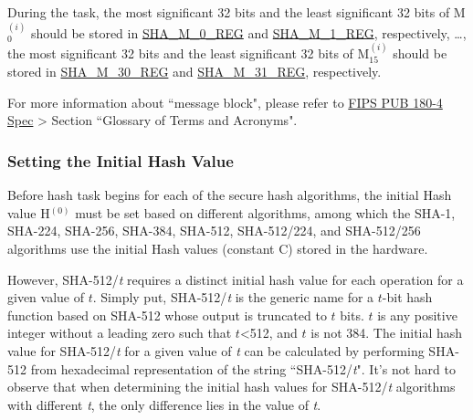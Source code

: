 \documentclass[main\_\_EN.tex]{subfiles}
\begin{document}
\begin{itemize}
    During the task, the most significant 32 bits and the least significant 32 bits of M$^{(i)}_0 $ should be stored in \hyperref[regdesc:SHAMNREG]{SHA\_M\_0\_REG} and \hyperref[regdesc:SHAMNREG]{SHA\_M\_1\_REG}, respectively, \dots, the most significant 32 bits and the least significant 32 bits of M$^{(i)}_{15}$ should be stored in \hyperref[regdesc:SHAMNREG]{SHA\_M\_30\_REG} and \hyperref[regdesc:SHAMNREG]{SHA\_M\_31\_REG}, respectively.

\end{itemize}

\begin{tiplisting}
\vspace{-0.5em}
For more information about ``message block", please refer to \href{https://doi.org/10.6028/NIST.FIPS.180-4}{FIPS PUB 180-4 Spec} > Section ``Glossary of Terms and Acronyms".
\end{tiplisting}

\subsubsection{Setting the Initial Hash Value}\label{sec:sha-initial-hash}

Before hash task begins for each of the secure hash algorithms, the initial Hash value H$^{(0)}$ must be set based on different algorithms, among which the SHA-1, SHA-224, SHA-256, SHA-384, SHA-512, SHA-512/224, and SHA-512/256 algorithms use the initial Hash values (constant C) stored in the hardware.

However, SHA-512/{\it{t}} requires a distinct initial hash value for each operation for a given value of \begin{math}t\end{math}. Simply put, SHA-512/{\it{t}} is the generic name for a \begin{math}t\end{math}-bit hash function based on SHA-512 whose output is truncated to \begin{math}t\end{math} bits. \begin{math}t\end{math} is any positive integer without a leading zero such that \begin{math}t\end{math}<512, and \begin{math}t\end{math} is not 384. The initial hash value for SHA-512/{\it{t}} for a given value of {\it{t}} can be calculated by performing SHA-512 from hexadecimal representation of the string ``SHA-512/{\it{t}}". It's not hard to observe that when determining the initial hash values for SHA-512/{\it{t}} algorithms with different {\it{t}}, the only difference lies in the value of {\it{t}}.
\end{document}
